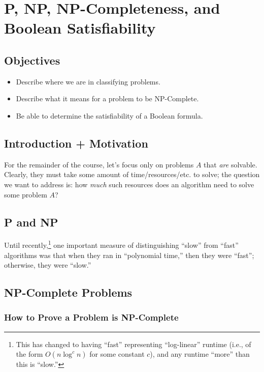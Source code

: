 \chapter{P, NP, NP-Completeness, and Boolean Satisfiability}

\section{Objectives}

\begin{itemize}
	\item Describe where we are in classifying problems.
	\item Describe what it means for a problem to be NP-Complete.
	\item Be able to determine the satisfiability of a Boolean formula.
\end{itemize}

\section{Introduction + Motivation}

For the remainder of the course, let's focus only on problems $A$ that \emph{are} solvable.
Clearly, they must take some amount of time/resources/etc. to solve; the question we want to address is: how \emph{much} such resources does an algorithm need to solve some problem $A$?

\section{P and NP}

Until recently,\footnote{This has changed to having ``fast'' representing ``log-linear'' runtime (i.e., of the form $O(n \log^c n)$ for some constant $c$), and any runtime ``more'' than this is ``slow.''} one important measure of distinguishing ``slow'' from ``fast'' algorithms was that when they ran in ``polynomial time,'' then they were ``fast''; otherwise, they were ``slow.''

\section{NP-Complete Problems}

\subsection{How to Prove a Problem is NP-Complete}

